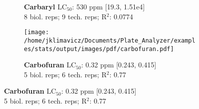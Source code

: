 \documentclass{article}
\begin{document}
\begin{figure}[thp!]
\begin{subfigure}{0.500\textwidth}
      \vspace{-0.05cm}
      \caption*{\textbf{Carbaryl} LC$_{50}$: 530 ppm [19.3, 1.51e4] \\ 
8 biol. reps; 9 tech. reps; R$^2$: 0.0774}
      \vspace{0.1cm}
   \end{subfigure}%
   \begin{subfigure}{0.500\textwidth}
      \centering
      \texttt{[image: /home/jklimavicz/Documents/Plate\_Analyzer/examples/stats/output/images/pdf/carbofuran.pdf]}
      \vspace{-0.05cm}
      \caption*{\textbf{Carbofuran} LC$_{50}$: 0.32 ppm [0.243, 0.415] \\ 
5 biol. reps; 6 tech. reps; R$^2$: 0.77}
      \vspace{0.1cm}
   \end{subfigure}%
\end{figure}
\clearpage
\pagebreak
\vspace{-0.1cm}
\end{document}
